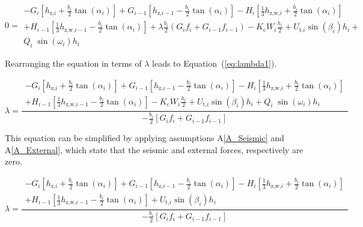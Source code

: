 \documentclass[12pt]{article}
\newcommand{\aref}[1]{A\ref{#1}}
\begin{document}
\begin{equation}\label{eq:Moment}
  0 = \begin{array}{l} - {G}_{i} \left[ {h_{\text{z,}i}} +
      \frac{b_{i}}{2} { \tan\left(\alpha_{i}\right)}
      \right] + {G}_{i-1} \left[ {h_{\text{z,}i-1}} -
      \frac{b_{i}}{2} { \tan\left(\alpha_{i}\right)}
      \right] - H_{i}\left[ \frac{1}{3} h_{\text{z,w,}i} +
      \frac{b_{i}}{2} { \tan\left(\alpha_{i}\right)}
      \right] \\[5pt] + H_{i-1}\left[ \frac{1}{3} h_{\text{z,w,}i-1} -
      \frac{b_{i}}{2} { \tan\left(\alpha_{i}\right)}
      \right] +\lambda \frac{b_{i}}{2} \left( G_{i}
    f_{i} + G_{i-1} f_{i-1} \right) -
    K_{\text{c}} W_{i} \frac{h_{i}}{2} + U_{\text{t,}i}
    \sin\left(\beta_{i}\right) h_{i} +\\
    Q_{i}\;{\sin\left(\omega_{i}\right)}
    h_{i} \end{array}
\end{equation} 

\noindent
Rearranging the equation in terms of $\lambda$ leads to 
Equation~(\ref{eq:lambda1}).

\begin{equation}\label{eq:lambda1}
  \lambda = \frac { \begin{array}{l} - {G}_{i} \left[
        {h_{\text{z,}i}} + \frac{b_{i}}{2} {
          \tan\left(\alpha_{i}\right)} \right] +
      {G}_{i-1} \left[ {h_{\text{z,}i-1}} -
        \frac{b_{i}}{2} { \tan\left(\alpha_{i}\right)}
        \right] - H_{i}\left[ \frac{1}{3} h_{\text{z,w,}i} +
        \frac{b_{i}}{2} { \tan\left(\alpha_{i}\right)}
        \right] \\[5pt] + H_{i-1}\left[ \frac{1}{3} h_{\text{z,w,}i-1} -
        \frac{b_{i}}{2} { \tan\left(\alpha_{i}\right)}
        \right] - K_{\text{c}} W_{i} \frac{h_{i}}{2} +
      U_{\text{t,}i} \sin\left(\beta_{i}\right) h_{i} +
      Q_{i}\;{\sin\left(\omega_{i}\right)}
      h_{i} \end{array} } { -\frac{b_{i}}{2} \left[
      G_{i} f_{i} + G_{i-1} f_{i-1}
      \right] }
\end{equation}

\noindent This equation can be simplified by applying assumptions 
\aref{A_Seismic} and \aref{A_External}, which state that the seismic and 
external forces, respectively are zero.

\begin{equation*}
\lambda = \frac { \begin{array}{l} - {G}_{i} \left[
	{h_{\text{z,}i}} + \frac{b_{i}}{2} {
		\tan\left(\alpha_{i}\right)} \right] +
	{G}_{i-1} \left[ {h_{\text{z,}i-1}} -
	\frac{b_{i}}{2} { \tan\left(\alpha_{i}\right)}
	\right] - H_{i}\left[ \frac{1}{3} h_{\text{z,w,}i} +
	\frac{b_{i}}{2} { \tan\left(\alpha_{i}\right)}
	\right] \\[5pt] + H_{i-1}\left[ \frac{1}{3} h_{\text{z,w,}i-1} -
	\frac{b_{i}}{2} { \tan\left(\alpha_{i}\right)}
	\right] +
	U_{\text{t,}i} \sin\left(\beta_{i}\right) h_{i} \end{array} } 
	{ -\frac{b_{i}}{2} \left[
	G_{i} f_{i} + G_{i-1} f_{i-1}
	\right] }
\end{equation*}
\end{document}
